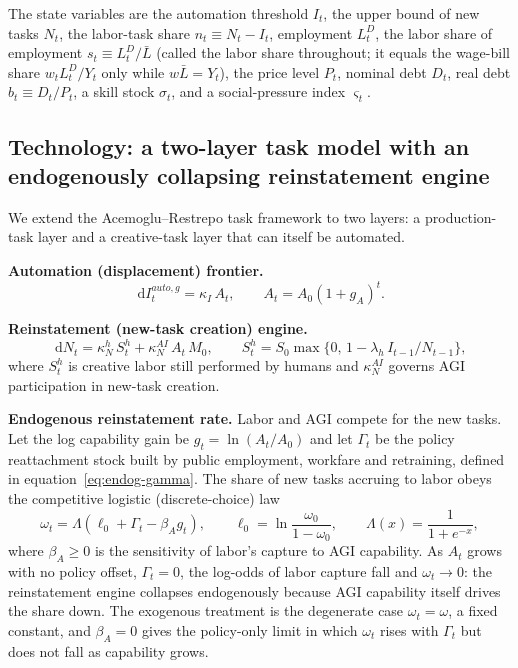\documentclass[review,12pt]{elsarticle}
\theoremstyle{plain}
\theoremstyle{definition}
\theoremstyle{remark}
\newcommand{\dd}{\,\mathrm{d}}
\newcommand{\barL}{\bar{L}}
\begin{document}
The state variables are the automation threshold $I_t$, the upper bound of new tasks $N_t$, the labor-task share $n_t\equiv N_t-I_t$, employment $L_t^D$, the labor share of employment $s_t\equiv L_t^D/\barL$ (called the labor share throughout; it equals the wage-bill share $w_tL_t^D/Y_t$ only while $w\barL=Y_t$), the price level $P_t$, nominal debt $D_t$, real debt $b_t\equiv D_t/P_t$, a skill stock $\sigma_t$, and a social-pressure index $\varsigma_t$.

\subsection{Technology: a two-layer task model with an endogenously collapsing reinstatement engine}
We extend the Acemoglu--Restrepo task framework to two layers: a production-task layer and a creative-task layer that can itself be automated.

\textbf{Automation (displacement) frontier.}
\begin{equation}
\dd I_t^{auto,g}=\kappa_I\,A_t,\qquad A_t=A_0(1+g_A)^t.
\end{equation}

\textbf{Reinstatement (new-task creation) engine.}
\begin{equation}
\dd N_t=\kappa_N^{h}\,S_t^h+\kappa_N^{AI}\,A_t\,M_0,
\qquad S_t^h=S_0\max\{0,\,1-\lambda_h\,I_{t-1}/N_{t-1}\},
\end{equation}
where $S_t^h$ is creative labor still performed by humans and $\kappa_N^{AI}$ governs AGI participation in new-task creation.

\textbf{Endogenous reinstatement rate.} Labor and AGI compete for the new tasks. Let the log capability gain be $g_t=\ln(A_t/A_0)$ and let $\Gamma_t$ be the policy reattachment stock built by public employment, workfare and retraining, defined in equation~\eqref{eq:endog-gamma}. The share of new tasks accruing to labor obeys the competitive logistic (discrete-choice) law
\begin{equation}
\label{eq:omega-law}
\omega_t=\Lambda\!\left(\ell_0+\Gamma_t-\beta_A g_t\right),\qquad
\ell_0=\ln\frac{\omega_0}{1-\omega_0},\qquad
\Lambda(x)=\frac{1}{1+e^{-x}},
\end{equation}
where $\beta_A\ge0$ is the sensitivity of labor's capture to AGI capability. As $A_t$ grows with no policy offset, $\Gamma_t=0$, the log-odds of labor capture fall and $\omega_t\to0$: the reinstatement engine collapses endogenously because AGI capability itself drives the share down. The exogenous treatment is the degenerate case $\omega_t=\omega$, a fixed constant, and $\beta_A=0$ gives the policy-only limit in which $\omega_t$ rises with $\Gamma_t$ but does not fall as capability grows.
\end{document}
